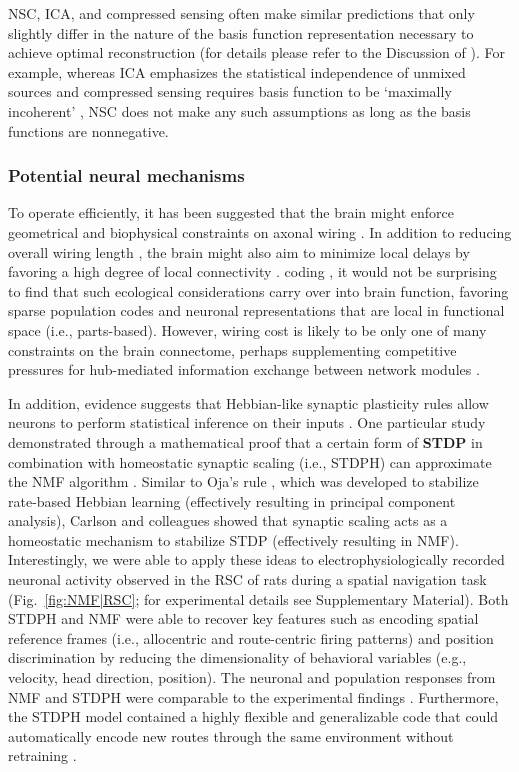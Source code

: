 \ac{NSC}, \ac{ICA}, and compressed sensing often make similar predictions
that only slightly differ in the nature of the basis function representation
necessary to achieve optimal reconstruction
(for details please refer to the Discussion of \cite{GanguliSompolinsky2012}).
For example, whereas \ac{ICA} emphasizes the statistical independence 
of unmixed sources
and compressed sensing requires basis function to be `maximally incoherent'
\cite{GanguliSompolinsky2012},
\ac{NSC} does not make any such assumptions
as long as the basis functions are nonnegative.


\subsubsection*{Potential neural mechanisms}

To operate efficiently, it has been suggested that the brain might enforce 
geometrical and biophysical constraints on axonal wiring 
\cite{LaughlinSejnowski2003}.
In addition to reducing overall wiring length
\cite{Cherniak1994}, the brain might also aim to minimize local delays
by favoring a high degree of local connectivity
\cite{Chklovskii2002}.
 coding \cite{Clopath2010},
it would not be surprising to find that such ecological considerations
carry over into brain function,
favoring sparse population codes and neuronal representations that are
local in functional space (i.e., parts-based).
However, wiring cost is likely to be only one of many constraints 
on the brain connectome, perhaps supplementing competitive pressures
for hub-mediated information exchange between network modules
\cite{Rubinov2015}.

In addition, evidence suggests that Hebbian-like synaptic plasticity rules
allow neurons to perform statistical inference on their inputs
\cite{Nessler2009,Carlson2013,MorenoBoteDrugowitsch2015,Oja1982}.
One particular study demonstrated through a mathematical proof
that a certain form of \textbf{\ac{STDP}} in combination with 
homeostatic synaptic scaling (i.e., \ac{STDPH})
can approximate the \ac{NMF} algorithm
\cite{Carlson2013}.
Similar to Oja's rule \cite{Oja1982}, which was developed to stabilize 
rate-based Hebbian learning
(effectively resulting in principal component analysis),
Carlson and colleagues showed that synaptic scaling acts as a 
homeostatic mechanism to stabilize \ac{STDP}
(effectively resulting in \ac{NMF}).
Interestingly, we were able to apply these ideas to 
electrophysiologically recorded neuronal activity observed in the \ac{RSC}
of rats during a spatial navigation task (Fig.~\ref{fig:NMF|RSC}; for experimental details see Supplementary Material). Both \ac{STDPH} and \ac{NMF} were able to recover key  features such as encoding spatial reference frames (i.e., allocentric and route-centric firing patterns) and position discrimination by reducing the dimensionality of behavioral variables (e.g., velocity, head direction, position).
The neuronal and population responses from NMF and STDPH were comparable to the experimental findings \cite{AlexanderNitz2015}.
Furthermore, the \ac{STDPH} model contained a highly flexible and generalizable code
that could automatically encode new routes through the same environment
without retraining \cite{Rounds2018}.


